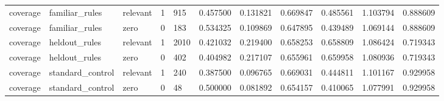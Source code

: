\begin{tabular}{lllllllllll}
coverage & familiar\_rules & relevant & 1 & 915 & 0.457500 & 0.131821 & 0.669847 & 0.485561 & 1.103794 & 0.888609 \\
coverage & familiar\_rules & zero & 0 & 183 & 0.534325 & 0.109869 & 0.647895 & 0.439489 & 1.069144 & 0.888609 \\
coverage & heldout\_rules & relevant & 1 & 2010 & 0.421032 & 0.219400 & 0.658253 & 0.658809 & 1.086424 & 0.719343 \\
coverage & heldout\_rules & zero & 0 & 402 & 0.404982 & 0.217107 & 0.655961 & 0.659958 & 1.080936 & 0.719343 \\
coverage & standard\_control & relevant & 1 & 240 & 0.387500 & 0.096765 & 0.669031 & 0.444811 & 1.101167 & 0.929958 \\
coverage & standard\_control & zero & 0 & 48 & 0.500000 & 0.081892 & 0.654157 & 0.410065 & 1.077991 & 0.929958 \\
\hline
\end{tabular}
